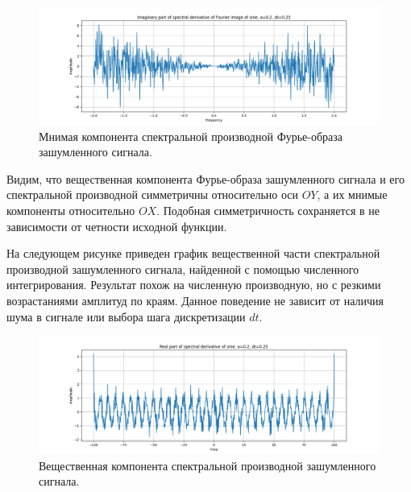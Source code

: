 \documentclass[a4paper, 12pt]{article}
\begin{document}
    \begin{figure}[H]
        \centering
        \includegraphics[scale=0.4]{1_im_spd_fimg_sine.png}
        \captionsetup{skip=0pt}
        \caption{Мнимая компонента спектральной производной Фурье-образа зашумленного сигнала.}
        \label{fig:1imspdf}
    \end{figure}


    Видим, что вещественная компонента Фурье-образа зашумленного сигнала и его спектральной производной симметричны относительно оси
    $OY$, а их мнимые компоненты относительно $OX$. Подобная симметричность сохраняется в не зависимости от четности исходной функции.


    На следующем рисунке приведен график вещественной части спектральной производной зашумленного сигнала, найденной с помощью численного интегрирования.
    Результат похож на численную производную, но с резкими возрастаниями амплитуд по краям. Данное поведение не зависит от наличия шума в сигнале или
    выбора шага дискретизации $dt$.
    \begin{figure}[H]
        \centering
        \includegraphics[scale=0.4]{1_re_specdiff_sine.png}
        \captionsetup{skip=0pt}
        \caption{Вещественная компонента спектральной производной зашумленного сигнала.}
        \label{fig:1respds}
    \end{figure}
\end{document}
